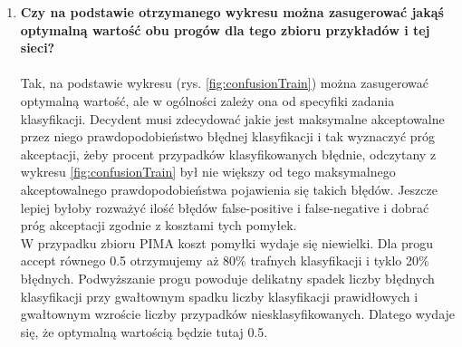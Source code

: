 \begin{enumerate}
\item \textbf{
Czy na podstawie otrzymanego wykresu można zasugerować jakąś optymalną wartość obu progów dla tego zbioru przykładów i tej sieci?}
\\\\Tak, na podstawie wykresu (rys. \ref{fig:confusionTrain}) można zasugerować optymalną wartość, ale w ogólności zależy ona od specyfiki zadania klasyfikacji. Decydent musi zdecydować jakie jest maksymalne akceptowalne przez niego prawdopodobieństwo błędnej klasyfikacji i tak wyznaczyć próg akceptacji, żeby procent przypadków klasyfikowanych błędnie, odczytany z wykresu \ref{fig:confusionTrain} był nie większy od tego maksymalnego akceptowalnego prawdopodobieństwa pojawienia się takich błędów. Jeszcze lepiej byłoby rozważyć ilość błędów false-positive i false-negative i dobrać próg akceptacji zgodnie z kosztami tych pomyłek.
\\W przypadku zbioru PIMA koszt pomyłki wydaje się niewielki. Dla progu accept równego 0.5 otrzymujemy aż 80\% trafnych klasyfikacji i tyklo 20\% błędnych. Podwyższanie progu powoduje delikatny spadek liczby błędnych klasyfikacji przy gwałtownym spadku liczby klasyfikacji prawidłowych i gwałtownym wzroście liczby przypadków niesklasyfikowanych. Dlatego wydaje się, że optymalną wartością będzie tutaj 0.5.

\end{enumerate}

